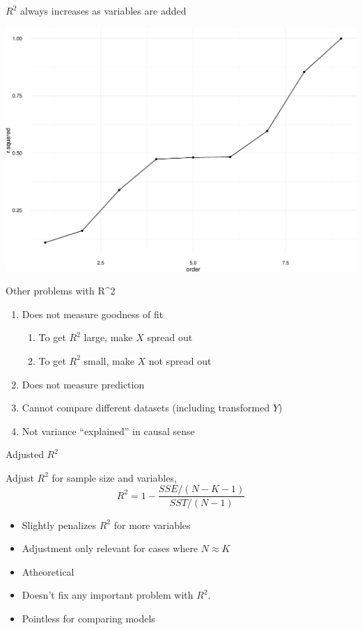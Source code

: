 \documentclass[ignorenonframetext,]{beamer}
\providecommand{\tightlist}{%
  \setlength{\itemsep}{0pt}\setlength{\parskip}{0pt}}
\begin{document}
\begin{frame}{\(R^2\) always increases as variables are added}

\includegraphics{r2_regression_fit_files/figure-beamer/unnamed-chunk-6-1.pdf}

\end{frame}

\begin{frame}{Other problems with R\^{}2}

\begin{enumerate}
\def\labelenumi{\arabic{enumi}.}
\tightlist
\item
  Does not measure goodness of fit

  \begin{enumerate}
  \def\labelenumii{\arabic{enumii}.}
  \tightlist
  \item
    To get \(R^2\) large, make \(X\) spread out
  \item
    To get \(R^2\) small, make \(X\) not spread out
  \end{enumerate}
\item
  Does not measure prediction
\item
  Cannot compare different datasets (including transformed \(Y\))
\item
  Not variance ``explained'' in causal sense
\end{enumerate}

\end{frame}

\begin{frame}{Adjusted \(R^2\)}

Adjust \(R^2\) for sample size and variables, \[
R^2 = 1 - \frac{SSE / (N - K - 1)}{SST / (N - 1)}
\]

\begin{itemize}
\tightlist
\item
  Slightly penalizes \(R^2\) for more variables
\item
  Adjustment only relevant for cases where \(N \approx K\)
\item
  Atheoretical
\item
  Doesn't fix any important problem with \(R^2\).
\item
  Pointless for comparing models
\end{itemize}

\end{frame}
\end{document}
